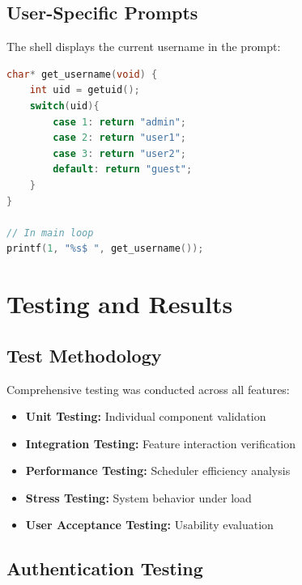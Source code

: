 \documentclass[a4paper,12pt]{report}
\begin{document}
\section{User-Specific Prompts}

The shell displays the current username in the prompt:

\begin{lstlisting}[language=C, caption=User Prompt (sh.c)]
char* get_username(void) {
    int uid = getuid();
    switch(uid){
        case 1: return "admin";
        case 2: return "user1";
        case 3: return "user2";
        default: return "guest";
    }
}

// In main loop
printf(1, "%s$ ", get_username());
\end{lstlisting}

\newpage

\chapter{Testing and Results}
\thispagestyle{contentpages}
\justifying

\section{Test Methodology}

Comprehensive testing was conducted across all features:

\begin{itemize}
    \item \textbf{Unit Testing:} Individual component validation
    \item \textbf{Integration Testing:} Feature interaction verification
    \item \textbf{Performance Testing:} Scheduler efficiency analysis
    \item \textbf{Stress Testing:} System behavior under load
    \item \textbf{User Acceptance Testing:} Usability evaluation
\end{itemize}

\section{Authentication Testing}
\end{document}
